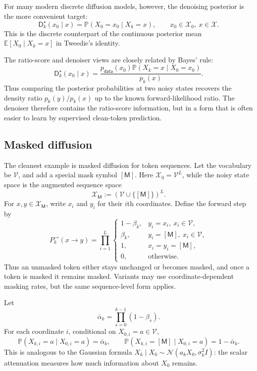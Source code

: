 \documentclass{amsart}
\numberwithin{equation}{section}
\theoremstyle{plain}
\theoremstyle{definition}
\theoremstyle{remark}
\newcommand{\E}{\mathbb{E}}
\newcommand{\Pp}{\mathbb{P}}
\newcommand{\Id}{I}
\newcommand{\cX}{\mathcal{X}}
\newcommand{\mc}[1]{\mathcal{#1}}
\newcommand{\pdata}{p_{\mathsf{data}}}
\newcommand{\dstar}{\mathsf{D}^{\star}}
\newcommand{\normal}[2]{\mathcal{N}\!\left(#1,#2\right)}
\begin{document}
For many modern discrete diffusion models, however, the denoising posterior is
the more convenient target:
\[
    \dstar_k(x_0\mid x)=\Pp(X_0=x_0\mid X_k=x),
    \qquad x_0\in\cX_0,\ x\in\cX.
\]
This is the discrete counterpart of the continuous posterior mean
$\E[X_0\mid X_k=x]$ in Tweedie's identity.

The ratio-score and denoiser views are closely related by Bayes' rule:
\[
    \dstar_k(x_0\mid x)
    =
    \frac{\pdata(x_0)\Pp(X_k=x\mid X_0=x_0)}{p_k(x)}.
\]
Thus comparing the posterior probabilities at two noisy states recovers the
density ratio $p_k(y)/p_k(x)$ up to the known forward-likelihood ratio.  The
denoiser therefore contains the ratio-score information, but in a form that is
often easier to learn by supervised clean-token prediction.

\subsection{Masked diffusion}

The cleanest example is masked diffusion for token sequences.  Let the
vocabulary be $\mc{V}$, and add a special mask symbol $[\mathsf M]$.
Here $\cX_0=\mc{V}^L$, while the noisy state space is the augmented
sequence space
\[
    \cX_{\mathsf M}:=(\mc{V}\cup\{[\mathsf M]\})^L.
\]
For $x,y\in\cX_{\mathsf M}$, write $x_i$ and $y_i$ for their $i$th
coordinates.  Define the forward step by
\begin{equation}\label{eq:mask-forward}
    P_k^{\to}(x\to y)
    =
    \prod_{i=1}^L
    \begin{cases}
    1-\beta_k, & y_i=x_i,\ x_i\in\mc{V},\\
    \beta_k, & y_i=[\mathsf M],\ x_i\in\mc{V},\\
    1, & x_i=y_i=[\mathsf M],\\
    0, & \text{otherwise}.
    \end{cases}
\end{equation}
Thus an unmasked token either stays unchanged or becomes masked, and once a
token is masked it remains masked.  Variants may use coordinate-dependent
masking rates, but the same sequence-level form applies.

Let
\[
    \bar\alpha_k=\prod_{s=0}^{k-1}(1-\beta_s).
\]
For each coordinate $i$, conditional on $X_{0,i}=a\in\mc{V}$,
\[
    \Pp(X_{k,i}=a\mid X_{0,i}=a)=\bar\alpha_k,\qquad
    \Pp(X_{k,i}=[\mathsf M]\mid X_{0,i}=a)=1-\bar\alpha_k.
\]
This is analogous to the Gaussian formula
$X_k\mid X_0\sim\normal{a_kX_0}{\sigma_k^2\Id}$: the scalar attenuation
measures how much information about $X_0$ remains.
\end{document}
